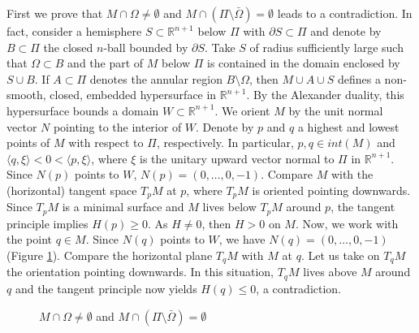 \documentclass[11pt]{amsart}
\theoremstyle{plain}
\numberwithin{equation}{section}
\numberwithin{theorem}{section}
\begin{document}
First we prove that $M\cap \Omega\neq \emptyset$ and $M\cap(\Pi\setminus \bar\Omega)=\emptyset$ leads to a contradiction. In fact, consider a hemisphere $S\subset\mathbb{R}^{n+1}$ below $\Pi$ with $\partial S \subset \Pi$ and denote by $B \subset \Pi$ the closed $n$-ball bounded by $\partial S$. Take $S$ of radius sufficiently large such that $\Omega \subset B$ and the part of $M$ below $\Pi$ is contained in the domain enclosed by $S\cup B$. If $A\subset \Pi$ denotes the annular region $B \setminus \Omega$, then $M\cup A\cup S$ defines a non-smooth, closed, embedded hypersurface in $\mathbb R^{n+1}$. By the Alexander duality, this hypersurface bounds a domain $W \subset \mathbb R^{n+1}$. We orient $M$ by the unit normal vector $N$ pointing to the interior of $W$.
Denote by $p$ and $q$ a highest and lowest points of $M$ with respect to $\Pi$, respectively. In particular, $p, q \in int(M)$ and  $\langle q, \xi\rangle < 0 < \langle p, \xi\rangle$, where $\xi$ is the unitary upward vector  normal to $\Pi$  in $\mathbb{R}^{n+1}$.  Since $N(p)$ points to $W$, $N(p)= (0,\ldots, 0,-1)$. Compare $M$ with the (horizontal) tangent space $T_p M$ at $p$, where $T_p M$ is oriented pointing downwards. Since $T_p M$ is a minimal surface and $M$ lives below $T_ p M$ around $p$, the tangent principle implies $H(p)\geq 0$. As $H\neq 0$, then $H >0$ on $M$. Now, we work with the point $q\in M$. Since $N(q)$ points to $W$, we have $N(q)= (0,\ldots, 0,-1)$ (Figure \ref{figura1}). Compare the horizontal plane $T_q M$ with $M$ at $q$. Let us take on $T_q M$ the orientation pointing downwards. In this situation, $T_q M$ lives above $M$ around $q$ and the tangent principle now yields $H(q)\leq  0$, a contradiction.
\begin{figure}
	\begin{center}
	\end{center}
	\caption{$M\cap \Omega\neq \emptyset$ and $M\cap(\Pi\setminus \bar\Omega)=\emptyset$ }
	\label{figura1}
\end{figure}
\end{document}
